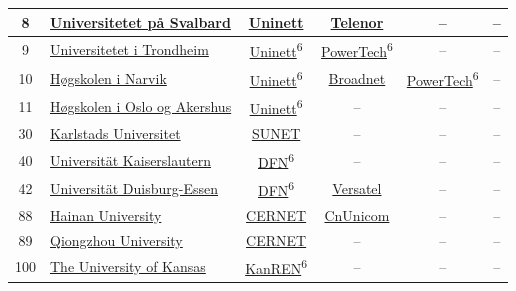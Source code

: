 \begin{small}
\begin{center}
\begin{longtable}{|c|c|c|c|c|c|}
 8 & \multicolumn{1}{|l|}{\index{Universitetet på Svalbard}\index{Site!Universitetet på Svalbard}\hyperref[sec:UNIS]{Universitetet på Svalbard}} & \href{https://www.uninett.no}{Uninett} & \href{https://www.telenor.no}{Telenor} & – & – \\ \hline
 9 & \multicolumn{1}{|l|}{\index{Universitetet i Trondheim}\index{Site!Universitetet i Trondheim}\hyperref[sec:NTNU]{Universitetet i Trondheim}} & \href{https://www.uninett.no}{Uninett}\textsuperscript{6} & \href{http://www.powertech.no}{PowerTech}\textsuperscript{6} & – & – \\ \hline
 10 & \multicolumn{1}{|l|}{\index{Høgskolen i Narvik}\index{Site!Høgskolen i Narvik}\hyperref[sec:HiN]{Høgskolen i Narvik}} & \href{https://www.uninett.no}{Uninett}\textsuperscript{6} & \href{https://www.broadnet.no}{Broadnet} & \href{http://www.powertech.no}{PowerTech}\textsuperscript{6} & – \\ \hline
 11 & \multicolumn{1}{|l|}{\index{Høgskolen i Oslo og Akershus}\index{Site!Høgskolen i Oslo og Akershus}\hyperref[sec:HiOA]{Høgskolen i Oslo og Akershus}} & \href{https://www.uninett.no}{Uninett}\textsuperscript{6} & – & – & – \\ \hline
 30 & \multicolumn{1}{|l|}{\index{Karlstads Universitet}\index{Site!Karlstads Universitet}\hyperref[sec:KAU]{Karlstads Universitet}} & \href{http://www.sunet.se}{SUNET} & – & – & – \\ \hline
 40 & \multicolumn{1}{|l|}{\index{Universität Kaiserslautern}\index{Site!Universität Kaiserslautern}\hyperref[sec:TUKL]{Universität Kaiserslautern}} & \href{https://www.dfn.de}{DFN}\textsuperscript{6} & – & – & – \\ \hline
 42 & \multicolumn{1}{|l|}{\index{Universität Duisburg-Essen}\index{Site!Universität Duisburg-Essen}\hyperref[sec:UDE]{Universität Duisburg-Essen}} & \href{https://www.dfn.de}{DFN}\textsuperscript{6} & \href{http://www.versatel.de}{Versatel} & – & – \\ \hline
 88 & \multicolumn{1}{|l|}{\index{Hainan University}\index{Site!Hainan University}\hyperref[sec:HU]{Hainan University}} & \href{http://www.cernet.edu.cn}{CERNET} & \href{http://www.chinaunicom.com}{CnUnicom} & – & – \\ \hline
 89 & \multicolumn{1}{|l|}{\index{Qiongzhou University}\index{Site!Qiongzhou University}\hyperref[sec:QU]{Qiongzhou University}} & \href{http://www.cernet.edu.cn}{CERNET} & – & – & – \\ \hline
 100 & \multicolumn{1}{|l|}{\index{The University of Kansas}\index{Site!The University of Kansas}\hyperref[sec:KU]{The University of Kansas}} & \href{http://www.kanren.net}{KanREN}\textsuperscript{6} & – & – & – \\ \hline

\end{longtable}
\end{center}
\end{small}
